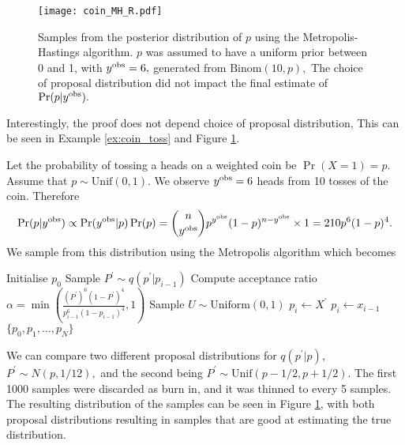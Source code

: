 \begin{figure}[htbp]
    \centering
    \texttt{[image: coin\_MH\_R.pdf]}
    \caption{
        Samples from the posterior distribution of $p$ using the
        Metropolis-Hastings algorithm. $p$ was assumed to
        have a uniform prior between 0 and 1, with $y^{\mathrm{obs}} = 6,$ generated
        from $\mathrm{Binom}(10, p),$
        The choice of proposal distribution did not impact the final estimate
        of $\Pr(p | y^{\mathrm{obs}}).$
    }
    \label{fig:coin_R}
\end{figure}

Interestingly, the proof does not depend choice of proposal distribution,
This can be seen in Example \ref{ex:coin_toss} and Figure \ref{fig:coin_R}.

\begin{example}\label{ex:coin_toss}
    Let the probability of tossing a heads on a weighted coin be
    $\Pr(X = 1) = p.$ Assume that $p\sim \mathrm{Unif}(0,1).$
    We observe $y^{\mathrm{obs}} = 6$ heads from 10 tosses of the coin.
    Therefore
    $$
        \Pr(p | y^{\mathrm{obs}}) \propto \Pr(y^{\mathrm{obs}}| p)\Pr(p)
        = \binom{n}{y^{\mathrm{obs}}}p^{y^{\mathrm{obs}}}(1 - p)^{n - y^{\mathrm{obs}}}\times 1
        = 210p^6(1-p)^4.
    $$
    We sample from this distribution using the Metropolis algorithm which
    becomes
    \begin{algorithmic}[1]
        \State Initialise $p_0$
        \State Sample $P^\prime \sim q(p^\prime|p_{i - 1})$
        \State Compute acceptance ratio
        $\alpha
            = \min\left(
            \frac{(P^\prime)^6(1-P^\prime)^4}{p_{i - 1}^6(1-p_{i - 1})^4}, 1
            \right)$ 
        \State Sample $U \sim \text{Uniform}(0, 1)$
        \State $p_i \gets X^\prime$
        \Else
        \State $p_i \gets x_{i - 1}$
        \EndIf
        \EndFor
        \State \Return $\{p_0, p_1, \dots, p_N\}$
    \end{algorithmic}

    We can compare two
    different proposal distributions for $q(p^\prime | p)$,
    $P^\prime \sim N(p, 1/12),$ and
    the second being $P^\prime \sim \mathrm{Unif}(p - 1/2, p + 1/2).$ The first
    1000 samples were discarded as burn in, and it was thinned to every 5
    samples.
    The resulting distribution of the samples can be seen in Figure
    \ref{fig:coin_R}, with both proposal distributions resulting in samples
    that are good at estimating the true distribution.
\end{example}

